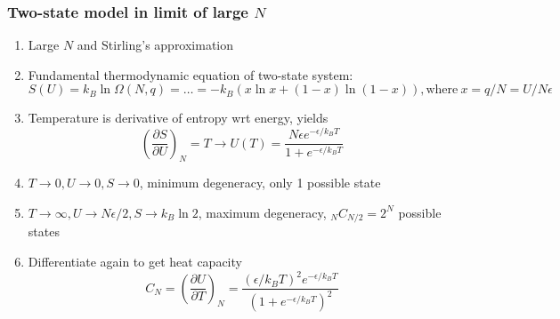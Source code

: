 \documentclass[11pt]{article}
\begin{document}
\subsubsection{Two-state model in limit of large \(N\)}
\label{sec:org21b38df}
\begin{enumerate}
\item Large \(N\) and Stirling's approximation
\item Fundamental thermodynamic equation of two-state system:
\begin{displaymath}
  S(U)=k_B\ln \Omega(N,q) = \ldots = -k_B \left ( x \ln x + (1-x) \ln (1-x) \right ), \mathrm{where}\
  x = q/N = U/N\epsilon
\end{displaymath}
\item Temperature is derivative of entropy wrt energy, yields
\begin{displaymath}
  \left( \frac{\partial S}{\partial U} \right )_N = T \rightarrow U(T) = \frac{N\epsilon e^{-\epsilon/k_BT}}{1+e^{-\epsilon/k_BT}}
\end{displaymath}
\item \(T \rightarrow 0, U \rightarrow 0, S \rightarrow 0\), minimum degeneracy, only 1 possible state
\item \(T \rightarrow \infty, U \rightarrow N\epsilon/2, S \rightarrow k_B \ln 2\), maximum degeneracy, \(_N C_{N/2} = 2^N\) possible states
\item Differentiate again to get heat capacity
\begin{displaymath}
  C_N = \left ( \frac{\partial U}{\partial T} \right )_N = \frac{(\epsilon/k_B T)^2 e^{-\epsilon/k_BT}}{(1+e^{-\epsilon/k_B T})^2}
\end{displaymath}
\end{enumerate}
\end{document}
